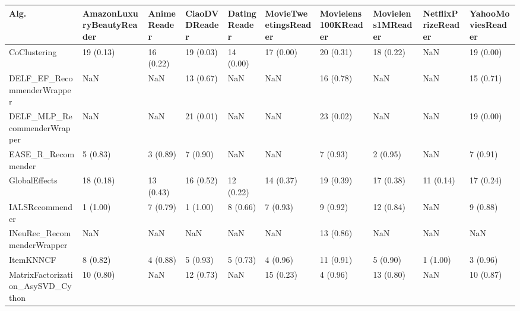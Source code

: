 \begin{tabular}{llllllllll}
\toprule
                               Alg. & AmazonLuxuryBeautyReader & AnimeReader & CiaoDVDReader & DatingReader & MovieTweetingsReader & Movielens100KReader & Movielens1MReader & NetflixPrizeReader & YahooMoviesReader \\
\midrule
                       CoClustering &                19 (0.13) &   16 (0.22) &     19 (0.03) &    14 (0.00) &            17 (0.00) &           20 (0.31) &         18 (0.22) &                NaN &         19 (0.00) \\
         DELF\_EF\_RecommenderWrapper &                      NaN &         NaN &     13 (0.67) &          NaN &                  NaN &           16 (0.78) &               NaN &                NaN &         15 (0.71) \\
        DELF\_MLP\_RecommenderWrapper &                      NaN &         NaN &     21 (0.01) &          NaN &                  NaN &           23 (0.02) &               NaN &                NaN &         19 (0.00) \\
                 EASE\_R\_Recommender &                 5 (0.83) &    3 (0.89) &      7 (0.90) &          NaN &                  NaN &            7 (0.93) &          2 (0.95) &                NaN &          7 (0.91) \\
                      GlobalEffects &                18 (0.18) &   13 (0.43) &     16 (0.52) &    12 (0.22) &            14 (0.37) &           19 (0.39) &         17 (0.38) &          11 (0.14) &         17 (0.24) \\
                    IALSRecommender &                 1 (1.00) &    7 (0.79) &      1 (1.00) &     8 (0.66) &             7 (0.93) &            9 (0.92) &         12 (0.84) &                NaN &          9 (0.88) \\
         INeuRec\_RecommenderWrapper &                      NaN &         NaN &           NaN &          NaN &                  NaN &           13 (0.86) &               NaN &                NaN &               NaN \\
                          ItemKNNCF &                 8 (0.82) &    4 (0.88) &      5 (0.93) &     5 (0.73) &             4 (0.96) &           11 (0.91) &          5 (0.90) &           1 (1.00) &          3 (0.96) \\
  MatrixFactorization\_AsySVD\_Cython &                10 (0.80) &         NaN &     12 (0.73) &          NaN &            15 (0.23) &            4 (0.96) &         13 (0.80) &                NaN &         10 (0.87) \\

\end{tabular}
